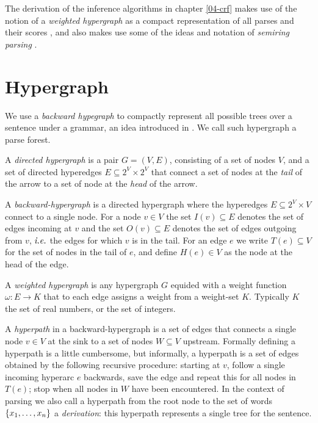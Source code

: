 % 

The derivation of the inference algorithms in chapter \ref{04-crf} makes use of the notion of a \textit{weighted hypergraph} as a compact representation of all parses and their scores \citep{gallo1993directed,klein2004parsing}, and also makes use some of the ideas and notation of \textit{semiring parsing} \citep{goodman1999semiring,eisner2009semirings}.

\section{Hypergraph}
  We use a \textit{backward hypegraph} to compactly represent all possible trees over a sentence under a grammar, an idea introduced in \citet{klein2004parsing}. We call such hypergraph a parse forest.

  \begin{definition}{}
    A \textit{directed hypergraph} is a pair $G = (V, E)$, consisting of a set of nodes $V$, and a set of directed hyperedges $E \subseteq 2^V \times 2^V$ that connect a set of nodes at the \textit{tail} of the arrow to a set of node at the \textit{head} of the arrow.
  \end{definition}

  \begin{definition}{}
    A \textit{backward-hypergraph} is a directed hypergraph where the hyperedges $E \subseteq 2^V \times V$ connect to a single node. For a node $v \in V$ the set $I(v) \subseteq E$ denotes the set of edges incoming at $v$ and the set $O(v) \subseteq E$ denotes the set of edges outgoing from $v$, $\emph{i.e.}$ the edges for which $v$ is in the tail. For an edge $e$ we write $T(e) \subseteq V$ for the set of nodes in the tail of $e$, and define $H(e) \in V$ as the node at the head of the edge.
  \end{definition}

  \begin{definition}{}
     A \textit{weighted hypergraph} is any hypergraph $G$ equided with a weight function $\omega : E \to K$ that to each edge assigns a weight from a weight-set $K$. Typically $K$ the set of real numbers, or the set of integers.
  \end{definition}

  \begin{definition}{}
    A \textit{hyperpath} in a backward-hypergraph is a set of edges that connects a single node $v \in V$ at the sink to a set of nodes $W \subseteq V$ upstream. Formally defining a hyperpath is a little cumbersome, but informally, a hyperpath is a set of edges obtained by the following recursive procedure: starting at $v$, follow a single incoming hyperarc $e$ backwards, save the edge and repeat this for all nodes in $T(e)$; stop when all nodes in $W$ have been encountered. In the context of parsing we also call a hyperpath from the root node to the set of words $\{ x_1, \dots, x_n \}$ a \textit{derivation}: this hyperpath represents a single tree for the sentence.
  \end{definition}


